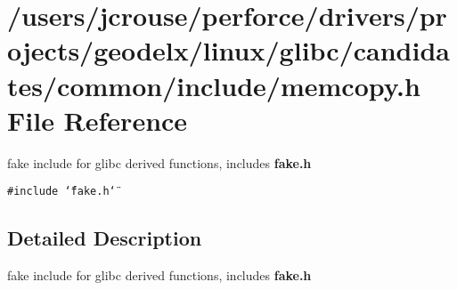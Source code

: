 \section{/users/jcrouse/perforce/drivers/projects/geodelx/linux/glibc/candidates/common/include/memcopy.h File Reference}
\label{memcopy_8h}
fake include for glibc derived functions, includes {\bf fake.h} 


{\tt \#include \char`\"{}fake.h\char`\"{}}\par


\subsection{Detailed Description}
fake include for glibc derived functions, includes {\bf fake.h}



